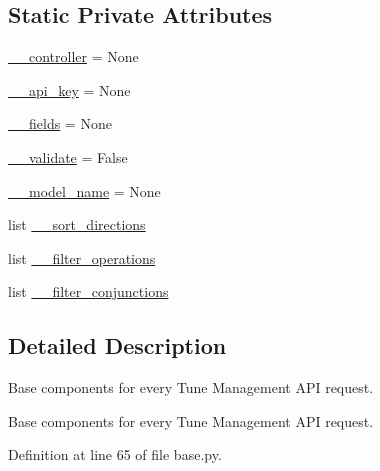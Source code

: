 \subsection*{Static Private Attributes}
\begin{DoxyCompactItemize}
\item 
\hyperlink{classtune_1_1management_1_1endpoints_1_1base_1_1TuneManagementBase_a7eb2a74b2e4271de8b86758a20dfcb98}{\-\_\-\-\_\-controller} = None
\item 
\hyperlink{classtune_1_1management_1_1endpoints_1_1base_1_1TuneManagementBase_a402a65f71acc926f4ffdda120822dbe8}{\-\_\-\-\_\-api\-\_\-key} = None
\item 
\hyperlink{classtune_1_1management_1_1endpoints_1_1base_1_1TuneManagementBase_ac4a85901e26423540bf102209827a737}{\-\_\-\-\_\-fields} = None
\item 
\hyperlink{classtune_1_1management_1_1endpoints_1_1base_1_1TuneManagementBase_a1cbfd5de3682af94b39f02abfd89e1dc}{\-\_\-\-\_\-validate} = False
\item 
\hyperlink{classtune_1_1management_1_1endpoints_1_1base_1_1TuneManagementBase_aa45c1144a2f1adf38d534562f69f49f0}{\-\_\-\-\_\-model\-\_\-name} = None
\item 
list \hyperlink{classtune_1_1management_1_1endpoints_1_1base_1_1TuneManagementBase_aeffbf18313b470d8d8feec8ee8916aaa}{\-\_\-\-\_\-sort\-\_\-directions}
\item 
list \hyperlink{classtune_1_1management_1_1endpoints_1_1base_1_1TuneManagementBase_a03dd75b057c56f6d1b0a9a3d7e26190f}{\-\_\-\-\_\-filter\-\_\-operations}
\item 
list \hyperlink{classtune_1_1management_1_1endpoints_1_1base_1_1TuneManagementBase_a7478579ae48607ab70b989f75e3a84ce}{\-\_\-\-\_\-filter\-\_\-conjunctions}
\end{DoxyCompactItemize}


\subsection{Detailed Description}
Base components for every Tune Management A\-P\-I request. 

Base components for every Tune Management A\-P\-I request. 

Definition at line 65 of file base.\-py.



